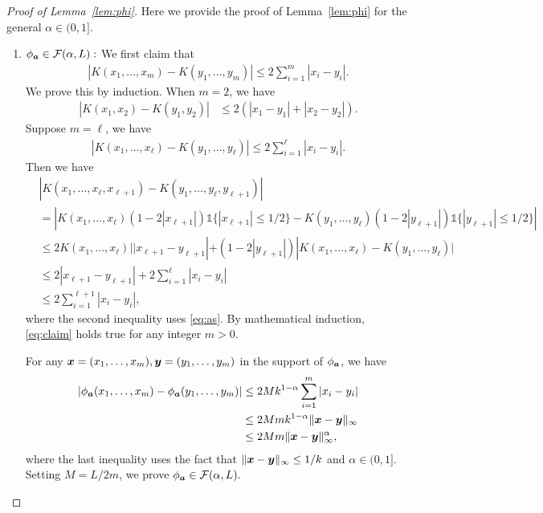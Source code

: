 \documentclass[12pt]{article}
\theoremstyle{definition}
\begin{document}
 \begin{proof}[Proof of Lemma~\ref{lem:phi}]
 Here we provide the proof of  Lemma~\ref{lem:phi} for the general $\alpha \in (0,1].$
 \begin{enumerate}
 \item $\phi_{\bm{a}}\in\mathcal{F}(\alpha,L):$
 We first claim that 
 \begin{align}\label{eq:claim}
     |K(x_1,\ldots,x_m)-K(y_1,\ldots,y_m)|\leq 2\sum_{i=1}^m|x_i-y_i|.
 \end{align}
 We prove this by induction.
 When $m = 2$, we have 
 \begin{align}
     |K(x_1,x_2)-K(y_1,y_2)|&\leq 2(|x_1-y_1|+|x_2-y_2|).
 \end{align}
 Suppose $m = \ell$, we have
 \begin{align}\label{eq:as}
    |K(x_1,\ldots,x_\ell)-K(y_1,\ldots,y_\ell)|\leq 2\sum_{i=1}^\ell|x_i-y_i|. 
 \end{align}
 Then we have
 \begin{align}
      &|K(x_1,\ldots,x_\ell, x_{\ell+1})-K(y_1,\ldots,y_\ell,y_{\ell+1})|\\&=\left|K(x_1,\ldots,x_\ell)(1-2|x_{\ell+1}|)\mathds{1}\{|x_{\ell+1}|\leq1/2\}- K(y_1,\ldots,y_\ell)(1-2|y_{\ell+1}|)\mathds{1}\{|y_{\ell+1}|\leq1/2\} \right|\\&\leq 2K(x_1,\ldots,x_\ell)||x_{\ell+1}-y_{\ell+1}|+(1-2|y_{\ell+1}|)|K(x_1,\ldots,x_\ell)-K(y_1,\ldots,y_\ell)|\\&\leq 2|x_{\ell+1}-y_{\ell+1}|+2\sum_{i=1}^\ell |x_i-y_i|\\&\leq2 \sum_{i=1}^{\ell+1}|x_i-y_i|,
 \end{align}
 where the second  inequality uses \eqref{eq:as}. 
By mathematical induction, \eqref{eq:claim} holds true for any integer $m>0$. 

For any $\bm x=(x_1,\ldots,x_m),\bm{y} = (y_1,\ldots,y_m)$ in the support of $\phi_{\bm{a}}$, we have
\begin{align}
    |\phi_{\bm{a}}(x_1,\ldots,x_m)-\phi_{\bm{a}}(y_1,\ldots,y_m)|&\leq 2Mk^{1-\alpha}\sum_{i=1}^m|x_i-y_i|\\&\leq 2Mm k^{1-\alpha} \|\bm x-\bm{y}\|_\infty\\&\leq 2Mm \|\bm x-\bm{y}\|_\infty^{\alpha},
\end{align}
where the last inequality uses the fact that $\|\bm x-\bm{y}\|_\infty\leq 1/k$ and $\alpha \in(0,1].$ Setting $M = L/2m$, we prove $\phi_{\bm{a}}\in\mathcal{F}(\alpha,L).$


\end{enumerate}
\end{proof}
\end{document}
